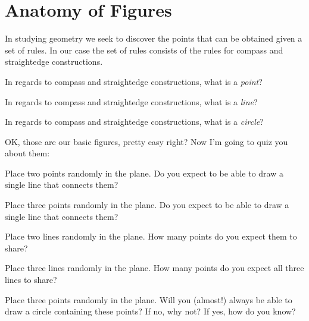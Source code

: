 \newpage



\section{Anatomy of Figures}


In studying geometry we seek to discover the points that can be
obtained given a set of rules. In our case the set of rules consists
of the rules for compass and straightedge constructions.

\begin{question} 
In regards to compass and straightedge constructions, what is a
\textit{point}?
\end{question}
\QM

\begin{question}
In regards to compass and straightedge constructions, what is a
\textit{line}?
\end{question}
\QM


\begin{question}
In regards to compass and straightedge constructions, what is a
\textit{circle}?
\end{question}
\QM


OK, those are our basic figures, pretty easy right? Now I'm going to
quiz you about them:

\begin{question} 
Place two points randomly in the plane. Do you expect to be able to
draw a single line that connects them?
\end{question}
\QM

\begin{question} 
Place three points randomly in the plane. Do you expect to be able to
draw a single line that connects them?
\end{question}
\QM

\begin{question} 
Place two lines randomly in the plane. How many points do you expect
them to share?
\end{question}
\QM


\begin{question} 
Place three lines randomly in the plane. How many points do you expect
all three lines to share?
\end{question}
\QM


\begin{question} 
Place three points randomly in the plane. Will you (almost!) always be
able to draw a circle containing these points? If no, why not? If yes,
how do you know?
\end{question}
\QM




